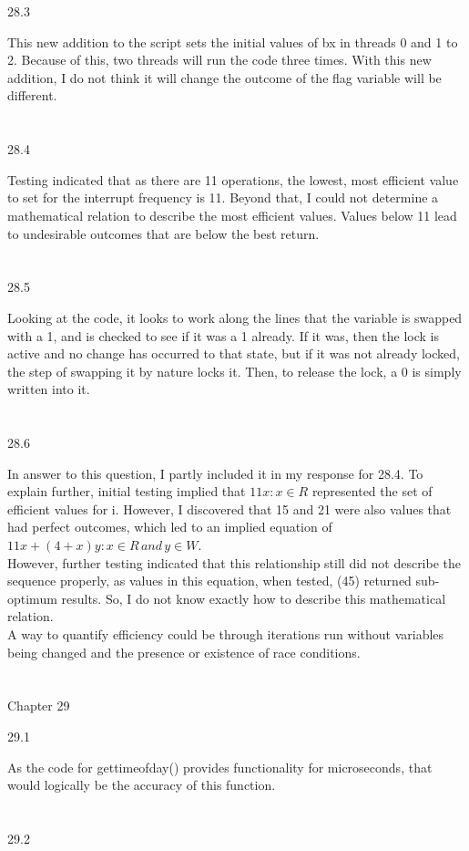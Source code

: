 \documentclass[12pt, a4paper]{article}
\begin{document}
28.3

	This new addition to the script sets the initial values of bx in threads 0 and 1 to 2. Because of this, two threads will run the code three times.  With this new addition, I do not think it will change the outcome of the flag variable will be different. \\ \\ \\

28.4

	Testing indicated that as there are 11 operations, the lowest, most efficient value to set for the interrupt frequency is 11. Beyond that, I could not determine a mathematical relation to describe the most efficient values. Values below 11 lead to undesirable outcomes that are below the best return.  \\ \\ \\ 

28.5

	Looking at the code, it looks to work along the lines that the variable is swapped with a 1, and is checked to see if it was a 1 already. If it was, then the lock is active and no change has occurred to that state, but if it was not already locked, the step of swapping it by nature locks it. Then, to release the lock, a 0 is simply written into it.\\ \\ \\

28.6

	In answer to this question, I partly included it in my response for 28.4. To explain further, initial testing implied that \(11x : x\in R\) represented the set of efficient values for i. However, I discovered that 15 and 21 were also values that had perfect outcomes, which led to an implied equation of \( 11x + (4+x)y: x\in R \, and \, y\in W\). \\ 
	
	 However, further testing indicated that this relationship still did not describe the sequence properly, as values in this equation, when tested, (45) returned sub-optimum results. So, I do not know exactly how to describe this mathematical relation.\\ 
	 
	 A way to quantify efficiency could be through iterations run without variables being changed and the presence or existence of race conditions. \\ \\ \\

\noindent
Chapter 29

29.1

	As the code for gettimeofday() provides functionality for microseconds, that would logically be the accuracy of this function. \\ \\ \\

29.2

	
\end{document}
